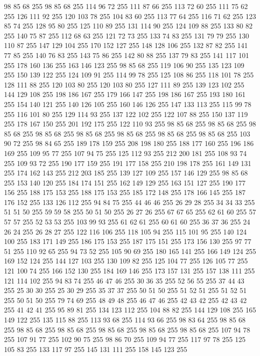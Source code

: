 98 85 68 255 98 85 68 255 114 96 72 255 111 87 66 255 113 72 60 255 111 75 62 255 126 111 92 255 120 103 78 255 104 83 60 255 113 77 64 255 116 71 62 255 123 85 74 255 128 95 80 255 125 110 89 255 131 114 90 255 124 109 88 255 133 80 82 255 140 75 87 255 112 68 63 255 121 72 73 255 133 74 83 255 131 79 79 255 130 110 87 255 147 129 104 255 170 152 127 255 148 128 106 255 132 87 82 255 141 77 85 255 140 76 83 255 143 75 86 255 142 80 88 255 137 79 83 255 141 117 101 255 178 160 136 255 163 146 123 255 98 85 68 255 119 106 90 255 135 123 109 255 150 139 122 255 124 109 91 255 114 99 78 255 125 108 86 255 118 101 78 255 128 111 88 255 120 103 80 255 120 103 80 255 127 111 89 255 139 123 102 255 144 129 108 255 198 186 167 255 179 166 147 255 198 186 167 255 193 180 161 255 154 140 121 255 140 126 105 255 160 146 126 255 147 133 113 255 115 99 78 255 116 101 80 255 129 114 93 255 137 122 102 255 122 107 88 255 150 137 119 255 178 167 150 255
201 192 175 255 122 110 93 255 98 85 68 255 98 85 68 255 98 85 68 255 98 85 68 255 98 85 68 255 98 85 68 255 98 85 68 255 98 85 68 255 103 90 72 255 98 84 65 255 189 178 159 255 208 198 180 255 188 177 160 255 196 186 169 255 109 95 77 255 107 94 75 255 125 112 93 255 212 200 181 255 108 93 74 255 109 93 72 255 190 177 159 255 191 177 158 255 210 198 178 255 161 149 131 255 174 162 143 255 212 203 185 255 139 127 109 255 157 146 129 255 98 85 68 255 153 140 120 255 184 174 151 255 162 149 129 255 163 151 127 255 190 177 156 255 188 175 153 255 188 175 153 255 185 172 148 255 178 166 145 255 187 176 152 255 133 126 112 255 94 84 75 255 44 46 46 255 26 29 28 255 34 34 33 255 51 51 50 255 59 59 58 255 50 51 50 255 26 27 26 255 67 67 65 255 62 61 60 255 57 57 57 255 52 53 53 255 103 99 93 255 61 62 61 255 60 61 60 255 36 37 36 255 24 26 24 255 26 28 27 255 122 116 106 255 118 105 94 255 115 101 95 255 140 124 100 255
183 171 149 255 186 175 153 255 187 175 151 255 173 156 130 255 97 77 51 255 110 92 65 255 94 73 52 255 105 90 69 255 180 165 141 255 166 149 124 255 169 152 124 255 144 127 103 255 130 109 82 255 125 104 77 255 126 105 77 255 121 100 74 255 166 152 130 255 184 169 146 255 173 157 131 255 157 138 111 255 121 114 102 255 94 83 74 255 46 47 46 255 30 36 35 255 52 56 55 255 37 44 43 255 25 30 30 255 25 30 29 255 35 37 37 255 50 51 50 255 51 52 51 255 51 52 51 255 50 51 50 255 79 74 69 255 48 49 48 255 46 47 46 255 42 43 42 255 42 43 42 255 41 42 41 255 95 89 81 255 134 123 112 255 104 88 82 255 144 129 108 255 165 149 122 255 135 115 88 255 113 93 68 255 114 93 66 255 98 83 64 255 98 85 68 255 98 85 68 255 98 85 68 255 98 85 68 255 98 85 68 255 98 85 68 255 107 94 78 255 107 91 77 255 102 90 75 255 98 86 70 255 109 94 77 255 117 97 78 255 125 105 83 255 133 117 97 255 145 131 111 255 158 145 123 255
